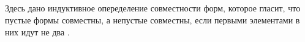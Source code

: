 \begin{code}%
\>[0]\<[2]%
\>[2]  \AgdaSymbol{:}  \AgdaSymbol{\{}\AgdaSymbol{\}}         \<%
\\
\>[2]\<[4]%
\>[4] \AgdaSymbol{:} \AgdaInductiveConstructor{[]}  \AgdaInductiveConstructor{[]}\<%
\\
\>[2]\<[4]%
\>[4] \AgdaSymbol{:}  \AgdaSymbol{\{}\AgdaSymbol{\}\{}  \AgdaSymbol{:}  \AgdaSymbol{\}}      \AgdaSymbol{(}  \AgdaSymbol{)}  \AgdaSymbol{(}  \AgdaSymbol{)}\<%
\\
\>[2]\<[4]%
\>[4] \AgdaSymbol{:}  \AgdaSymbol{\{}\AgdaSymbol{\}\{}  \AgdaSymbol{:}  \AgdaSymbol{\}}      \AgdaSymbol{(}  \AgdaSymbol{)}  \AgdaSymbol{(}  \AgdaSymbol{)}\<%
\\
\>[2]\<[4]%
\>[4] \AgdaSymbol{:}  \AgdaSymbol{\{}\AgdaSymbol{\}\{}  \AgdaSymbol{:}  \AgdaSymbol{\}}      \AgdaSymbol{(}  \AgdaSymbol{)}  \AgdaSymbol{(}  \AgdaSymbol{)}\<%
\end{code}

Здесь дано индуктивное опеределение совместности форм, которое гласит,
что пустые формы совместны, а непустые совместны, если первыми
элементами в них идут не два .

